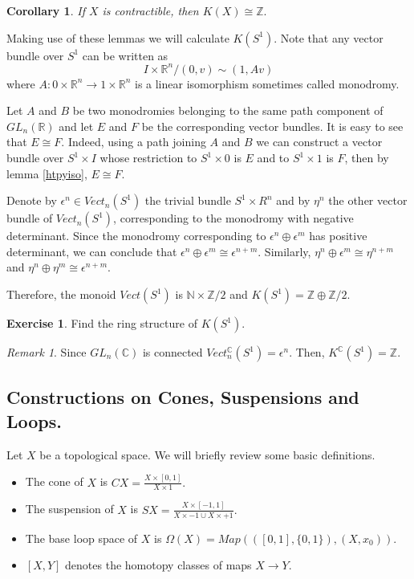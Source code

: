 \documentclass[a4paper,10pt]{article}
\theoremstyle{plain}%
\newtheorem{cor}{Corollary}
\theoremstyle{definition}
\newtheorem{exer}{Exercise}
\theoremstyle{remark}
\newtheorem{rem}{Remark}
\newcommand{\NN}{\mathbb{N}}
\newcommand{\ZZ}{\mathbb{Z}}
\newcommand{\RR}{\mathbb{R}}
\newcommand{\CC}{\mathbb{C}}
\begin{document}
\begin{cor}
If $X$ is contractible, then $K(X)\cong \ZZ.$
\end{cor}

Making use of these lemmas we will calculate $K(S^1).$ Note that any vector bundle over $S^1$ can be written as
\[
I \times \RR^n\big/ (0,v) \sim (1,Av)
\]
where $A:0\times \RR^n \to 1\times \RR^n$ is a linear isomorphism sometimes called monodromy.

Let $A$ and $B$ be two monodromies belonging to the same path component of $GL_n(\RR)$ and let $E$ and $F$ be the corresponding vector bundles.  It is easy to see that $E\cong F$. Indeed, using a path joining $A$ and $B$ we can construct a vector bundle over $S^1\times I$ whose restriction to $S^1\times 0$ is $E$ and to $S^1\times 1$ is $F$, then by lemma \ref{htpyiso}, $E\cong F$.

Denote by $\epsilon^n\in Vect_n(S^1)$ the trivial bundle $S^1\times R^n$ and by $\eta^n$ the other vector bundle of $Vect_n(S^1)$, corresponding to the monodromy with negative determinant. Since the monodromy corresponding to $\epsilon^n\oplus\epsilon^m$ has positive determinant, we can conclude that $\epsilon^n\oplus\epsilon^m\cong \epsilon^{n+m}.$ Similarly, $\eta^n\oplus\epsilon^m\cong \eta^{n+m}$ and $\eta^n\oplus\eta^m\cong \epsilon^{n+m}.$

Therefore, the monoid $Vect(S^1)$ is $\NN\times\ZZ/2$ and $K(S^1)=\ZZ\oplus \ZZ / 2.$

\begin{exer}
Find the ring structure of $K(S^1).$
\end{exer}

\begin{rem}
Since $GL_n(\CC)$ is connected $Vect_n^{\CC}(S^1) = {\epsilon^n}$. Then, $K^\CC (S^1) = \ZZ.$
\end{rem}

\subsection{Constructions on Cones, Suspensions and Loops.}

Let $X$ be a topological space. We will briefly review some basic definitions.

\begin{itemize}
\item The cone of $X$ is $CX=\frac{X\times[0,1]}{X\times 1}.$

\item The suspension of $X$ is $SX = \frac{X \times [-1,1]}{X\times -1\cup X\times +1}.$

\item The base loop space of $X$ is $\Omega (X) =  Map(([0,1],\{0,1\}),(X,x_0)).$

\item $[X,Y]$ denotes the homotopy classes of maps $X\to Y.$
\end{itemize}
\end{document}
